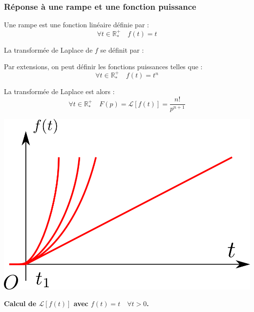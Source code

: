 \documentclass[10pt,fleqn]{article} %
\begin{document}
\subsubsection*{Réponse à une rampe et une fonction puissance}
\begin{minipage}[c]{.6\linewidth}
\begin{defi}
Une rampe est une fonction linéaire définie par : 
$$ \forall t \in \mathbb{R}^+_* \quad f(t) = t$$

La transformée de Laplace de $f$ se définit par : 

\end{defi}
\begin{defi}
Par extensions, on peut définir les fonctions puissances telles que :
$$ \forall t \in \mathbb{R}^+_* \quad f(t) = t^n$$

La transformée de Laplace est alors :
$$ \forall t\in \mathbb{R}^+_*  \quad
F(p) = \mathcal{L} \left[f(t)\right]  =
\dfrac{n!}{p^{n+1}} $$
\end{defi}
\end{minipage} \hfill
\begin{minipage}[c]{.35\linewidth}
\begin{center}
\includegraphics[width=.9\textwidth]{images/rampe}
\end{center}
\end{minipage}


\textbf{Calcul de $\mathcal{L}\left[f(t) \right]$ avec $f(t)=t\quad \forall t> 0$.}
\end{document}
